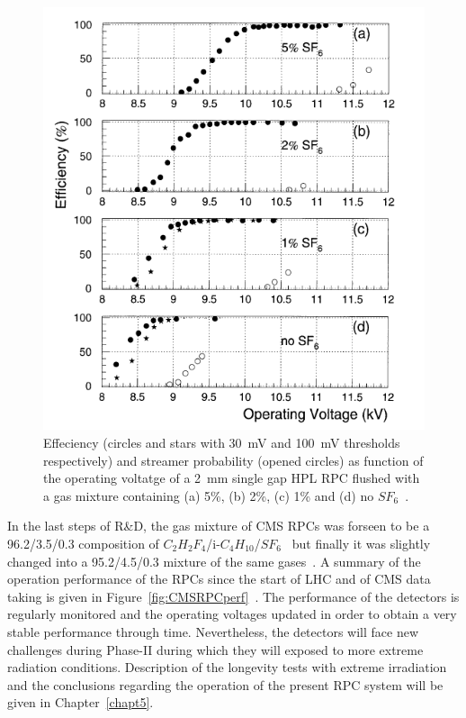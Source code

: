 	\begin{figure}[H]
		\centering
		\includegraphics[width = 0.7\plotwidth]{fig/chapt4/SF6.png}
		\caption{\label{fig:SF6} Effeciency (circles and stars with \SI{30}{mV} and \SI{100}{mV} thresholds respectively) and streamer probability (opened circles) as function of the operating voltatge of a \SI{2}{mm} single gap HPL RPC flushed with a gas mixture containing (a) 5\%, (b) 2\%, (c) 1\% and (d) no $SF_6$~\cite{CAMARRI98}.}
	\end{figure}
	
	In the last steps of R\&D, the gas mixture of CMS RPCs was forseen to be a 96.2/3.5/0.3 composition of $C_2H_2F_4$/i-$C_4H_{10}$/$SF_6$~\cite{ABBRESCIA2005} but finally it was slightly changed into a 95.2/4.5/0.3 mixture of the same gases~\cite{THYSSEN2012}. A summary of the operation performance of the RPCs since the start of LHC and of CMS data taking is given in Figure~\ref{fig:CMSRPCperf}~\cite{SHAH2018}. The performance of the detectors is regularly monitored and the operating voltages updated in order to obtain a very stable performance through time. Nevertheless, the detectors will face new challenges during Phase-II during which they will exposed to more extreme radiation conditions. Description of the longevity tests with extreme irradiation and the conclusions regarding the operation of the present RPC system will be given in Chapter~\ref{chapt5}.
	
